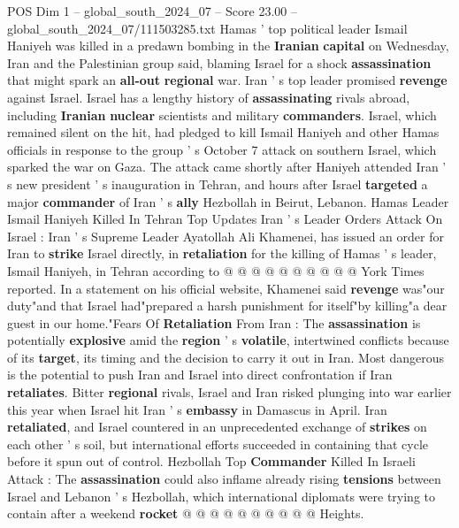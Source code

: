 \begin{textsample}{POS Dim 1 – global\_south\_2024\_07 – Score 23.00 – global\_south\_2024\_07/111503285.txt}  \label{ex:f1_pos_070}
Hamas ' top political leader Ismail Haniyeh was killed in a predawn bombing in the \textbf{Iranian} \textbf{capital} on Wednesday, Iran and the Palestinian group said, blaming Israel for a shock \textbf{assassination} that might spark an \textbf{all-out} \textbf{regional} war.
Iran ' s top leader promised \textbf{revenge} against Israel.
Israel has a lengthy history of \textbf{assassinating} rivals abroad, including \textbf{Iranian} \textbf{nuclear} scientists and military \textbf{commanders}.
Israel, which remained silent on the hit, had pledged to kill Ismail Haniyeh and other Hamas officials in response to the group ' s October 7 attack on southern Israel, which sparked the war on Gaza.
The attack came shortly after Haniyeh attended Iran ' s new president ' s inauguration in Tehran, and hours after Israel \textbf{targeted} a major \textbf{commander} of Iran ' s \textbf{ally} Hezbollah in Beirut, Lebanon.
Hamas Leader Ismail Haniyeh Killed In Tehran Top Updates Iran ' s Leader Orders Attack On Israel : Iran ' s Supreme Leader Ayatollah Ali Khamenei, has issued an order for Iran to \textbf{strike} Israel directly, in \textbf{retaliation} for the killing of Hamas ' s leader, Ismail Haniyeh, in Tehran according to @ @ @ @ @ @ @ @ @ @ York Times reported.
In a statement on his official website, Khamenei said \textbf{revenge} was"our duty"and that Israel had"prepared a harsh punishment for itself"by killing"a dear guest in our home."Fears Of \textbf{Retaliation} From Iran : The \textbf{assassination} is potentially \textbf{explosive} amid the \textbf{region} ' s \textbf{volatile}, intertwined conflicts because of its \textbf{target}, its timing and the decision to carry it out in Iran.
Most dangerous is the potential to push Iran and Israel into direct confrontation if Iran \textbf{retaliates}.
Bitter \textbf{regional} rivals, Israel and Iran risked plunging into war earlier this year when Israel hit Iran ' s \textbf{embassy} in Damascus in April.
Iran \textbf{retaliated}, and Israel countered in an unprecedented exchange of \textbf{strikes} on each other ' s soil, but international efforts succeeded in containing that cycle before it spun out of control.
Hezbollah Top \textbf{Commander} Killed In Israeli Attack : The \textbf{assassination} could also inflame already rising \textbf{tensions} between Israel and Lebanon ' s Hezbollah, which international diplomats were trying to contain after a weekend \textbf{rocket} @ @ @ @ @ @ @ @ @ @ Heights.

\end{textsample}

